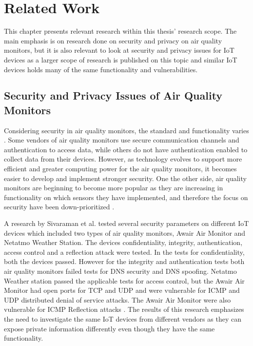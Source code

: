 \chapter{Related Work}
This chapter presents relevant research within this thesis' research scope. The main emphasis is on research done on security and privacy on air quality monitors, but it is also relevant to look at security and privacy issues for \gls{IoT} devices as a larger scope of research is published on this topic and similar \gls{IoT} devices holds many of the same functionality and vulnerabilities.

\section{Security and Privacy Issues of Air Quality Monitors}
Considering security in air quality monitors, the standard and functionality varies \cite{AQMHowFarFunctionality}. Some vendors of air quality monitors use secure communication channels and authentication to access data, while others do not have authentication enabled to collect data from their devices. However, as technology evolves to support more efficient and greater computing power for the air quality monitors, it becomes easier to develop and implement stronger security. One the other side, air quality monitors are beginning to become more popular as they are increasing in functionality on which sensors they have implemented, and therefore the focus on security have been down-prioritized \cite{SecurityAndDataIntInAQM}.

A research by Sivaraman et al. \cite{IoTSecurityandPrivacyImpl} tested several security parameters on different \gls{IoT} devices which included two types of air quality monitors, Awair Air Monitor and Netatmo Weather Station. The devices confidentiality, integrity, authentication, access control and a reflection attack were tested. In the tests for confidentiality, both the devices passed. However for the integrity and authentication tests both air quality monitors failed tests for \gls{DNS} security and \gls{DNS} spoofing. Netatmo Weather station passed the applicable tests for access control, but the Awair Air Monitor had open ports for \gls{TCP} and \gls{UDP} and were vulnerable for \gls{ICMP} and \gls{UDP} distributed denial of service attacks. The Awair Air Monitor were also vulnerable for ICMP Reflection attacks \cite{IoTSecurityandPrivacyImpl}. The results of this research emphasizes the need to investigate the same \gls{IoT} devices from different vendors as they can expose private information differently even though they have the same functionality. 

